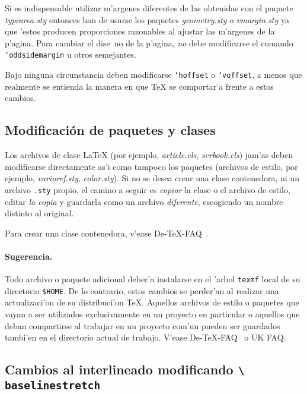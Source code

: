 \documentclass[11pt,a4paper,pagesize,tablecaptionabove,abstracton,pointlessnumbers]{scrartcl}
\newcommand{\gl}{\guillemotleft}
\newcommand{\gr}{\guillemotright}
\newcommand{\Doku}[1]{\textsf{#1}\xspace}
\newcommand{\Paket}[1]{\textsf{\textsl{#1.sty}}\xspace}
\newcommand{\Klasse}[1]{\textsf{\textsl{#1.cls}}\xspace}
\DeclareRobustCommand*{\Macro}[1]{\mbox{\texttt{\char`\\#1}}}
\begin{document}
Si es indispensable utilizar m'argenes diferentes de las obtenidas con el paquete \Paket{typearea} entonces han de usarse los paquetes \Paket{geometry} o \Paket{vmargin} ya que 'estos producen proporciones razonables al ajustar las m'argenes de la p'agina. Para cambiar el dise~no de la p'agina, \emph{no} debe modificarse el comando \Macro{oddsidemargin} u otros semejantes.

Bajo ninguna circunstancia deben modificarse \Macro{hoffset} o \Macro{voffset},
a menos que realmente se entienda la manera en que \TeX{} se comportar'a frente a estos cambios.

\subsection{Modificaci\'on de paquetes y clases}
\label{sec:ander-von-paket}
Los archivos de clase \LaTeX{} (por ejemplo, \Klasse{article}, \Klasse{scrbook}) jam'as deben modificarse directamente as'i como tampoco los paquetes (archivos de estilo, por ejemplo, \Paket{varioref}, \Paket{color}). Si no se desea crear una \gl clase contenedora\gr, ni un archivo \texttt{.sty} propio, el camino a seguir es \emph{copiar} la clase o el archivo de estilo, editar \emph{la copia} y guardarla como un archivo \emph{diferente}, escogiendo un nombre distinto al original.

Para crear una clase contenedora, v'ease \Doku{De-TeX-FAQ}~\cite[pregunta 5.1.5]{faq:02}.

\paragraph{Sugerencia.}
\label{sec:hinweis}

Todo archivo o paquete adicional deber'a instalarse en el 'arbol \texttt{texmf} local de su directorio \texttt{\$HOME}. De lo contrario, estos cambios se perder'an al realizar una actualizaci'on de su distribuci'on \TeX{}. Aquellos archivos de estilo o paquetes que vayan a ser utilizados exclusivamente en un proyecto en particular o aquellos que deban compartirse al trabajar en un proyecto com'un pueden ser guardados tambi'en en el directorio actual de trabajo. V'ease \Doku{De-TeX-FAQ}~\cite[pregunta 5.1.4]{faq:02} o \Doku{UK FAQ}\cite[\textit{Installing \LaTeX{} files}, secci'on K, \textit{Where to put new files}, pregunta 90]{ukfaq:99}.

\subsection{Cambios al interlineado modificando \texttt{\textbackslash
    baselinestretch}} 
\label{sec:ander-des-zeil}
\end{document}
